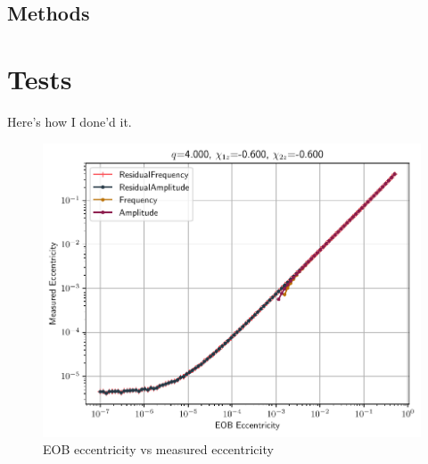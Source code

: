 \documentclass[aps,prd,amsmath,floats,floatfix, twocolumn,
superscriptaddress,nofootinbib,showpacs]{revtex4-1}
\begin{document}
\subsection{Methods}
\label{sec:methods}

\section{Tests}
\label{sec:tests}
Here's how I done'd it.

\begin{figure}[thb]
\includegraphics[width=\columnwidth]{test_eob_vs_measured_ecc_example}
\caption{EOB eccentricity vs measured eccentricity}
\label{fig:eob_vs_measured_ecc}
\end{figure}
\end{document}
